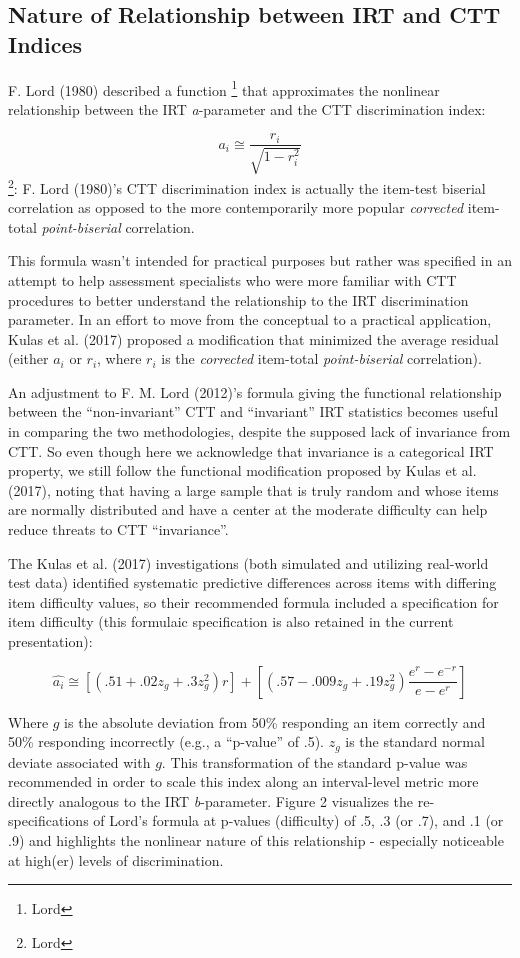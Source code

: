 \documentclass[
  man]{apa6}
\begin{document}
\hypertarget{nature-of-relationship-between-irt-and-ctt-indices}{%
\subsection{Nature of Relationship between IRT and CTT Indices}\label{nature-of-relationship-between-irt-and-ctt-indices}}

F. Lord (1980) described a function \footnote{Lord} that approximates the nonlinear relationship between the IRT \emph{a}-parameter and the CTT discrimination index:

\[a_i\cong \frac{r_i}{\sqrt{1-r_i^2}}\]
\footnote{Lord}: F. Lord (1980)'s CTT discrimination index is actually the item-test biserial correlation as opposed to the more contemporarily more popular \emph{corrected} item-total \emph{point-biserial} correlation.

This formula wasn't intended for practical purposes but rather was specified in an attempt to help assessment specialists who were more familiar with CTT procedures to better understand the relationship to the IRT discrimination parameter. In an effort to move from the conceptual to a practical application, Kulas et al. (2017) proposed a modification that minimized the average residual (either \(a_i\) or \(r_i\), where \(r_i\) is the \emph{corrected} item-total \emph{point-biserial} correlation).

An adjustment to F. M. Lord (2012)'s formula giving the functional relationship between the ``non-invariant'' CTT and ``invariant'' IRT statistics becomes useful in comparing the two methodologies, despite the supposed lack of invariance from CTT. So even though here we acknowledge that invariance is a categorical IRT property, we still follow the functional modification proposed by Kulas et al. (2017), noting that having a large sample that is truly random and whose items are normally distributed and have a center at the moderate difficulty can help reduce threats to CTT ``invariance''.

The Kulas et al. (2017) investigations (both simulated and utilizing real-world test data) identified systematic predictive differences across items with differing item difficulty values, so their recommended formula included a specification for item difficulty (this formulaic specification is also retained in the current presentation):

\[\hat{a_i}\cong[(.51 + .02z_g + .3z_g^2)r]+[(.57 - .009z_g + .19z_g^2)\frac{e^r-e^{-r}}{e-e^r}]\]

Where \(g\) is the absolute deviation from 50\% responding an item correctly and 50\% responding incorrectly (e.g., a ``p-value'' of .5). \(z_g\) is the standard normal deviate associated with \(g\). This transformation of the standard p-value was recommended in order to scale this index along an interval-level metric more directly analogous to the IRT \emph{b}-parameter. Figure 2 visualizes the re-specifications of Lord's formula at p-values (difficulty) of .5, .3 (or .7), and .1 (or .9) and highlights the nonlinear nature of this relationship - especially noticeable at high(er) levels of discrimination.
\end{document}
